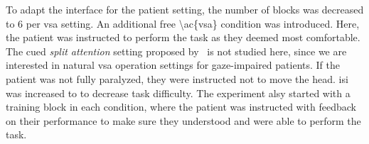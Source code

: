 To adapt the interface for the patient setting, the number of blocks was
decreased to 6 per \ac{vsa} setting.
An additional \ac{free \ac{vsa}} condition was introduced.
Here, the patient was instructed to perform the task as they deemed most
comfortable.
The cued \emph{split attention} setting proposed
by~\textcite{VanDenKerchove2024} is not studied here, since we are interested
in natural \ac{vsa} operation settings for gaze-impaired patients.
If the patient was not fully paralyzed, they were instructed not to move the head.
\Ac{isi} was increased to to decrease task difficulty.
The experiment alsy started with a training block in each condition, where the
patient was instructed with feedback on their performance to make sure they
understood and were able to perform the task.

